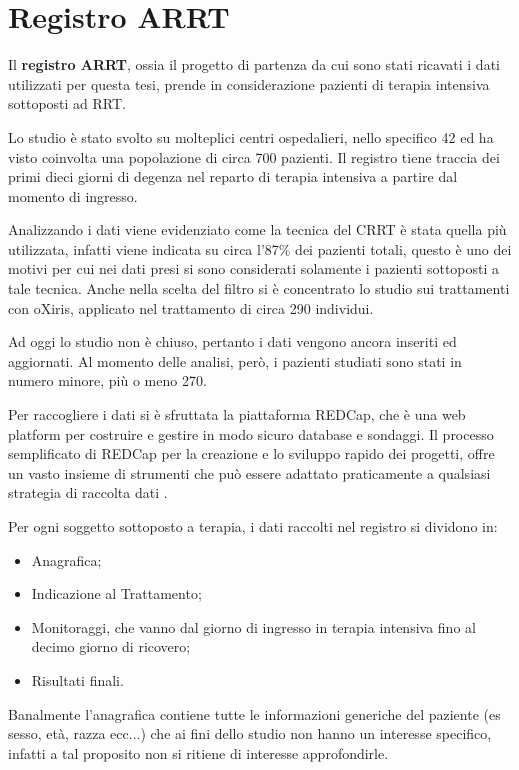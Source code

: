 \chapter{Registro ARRT}


Il \textbf{registro ARRT}, ossia il progetto di partenza da cui sono stati ricavati i dati utilizzati per questa tesi, prende in considerazione pazienti di terapia intensiva sottoposti ad RRT.

Lo studio è stato svolto su molteplici centri ospedalieri, nello specifico 42 ed ha visto coinvolta una popolazione di circa 700 pazienti. Il registro tiene traccia dei primi dieci giorni di degenza nel reparto di terapia intensiva a partire dal momento di ingresso.

Analizzando i dati viene evidenziato come la tecnica del CRRT è stata quella più utilizzata, infatti viene  indicata su circa  l'87\% dei pazienti totali, questo è uno dei motivi per cui nei dati presi si sono considerati solamente i pazienti sottoposti a tale tecnica.
Anche nella scelta del filtro si è concentrato lo studio sui trattamenti con oXiris, applicato nel trattamento di circa 290 individui.

Ad oggi lo studio non è chiuso, pertanto i dati vengono ancora inseriti ed aggiornati. Al momento delle analisi, però, i pazienti studiati sono stati in numero minore, più o meno 270.

Per raccogliere i dati si è sfruttata la piattaforma REDCap, che è una web platform per costruire e gestire in modo sicuro database e sondaggi. Il processo semplificato di REDCap per la creazione e lo sviluppo rapido dei progetti, offre un vasto insieme di strumenti che può essere adattato praticamente a qualsiasi strategia di raccolta dati \cite{REDCap}. 


Per ogni soggetto sottoposto a terapia, i dati raccolti nel registro si dividono in: 
\begin{itemize}
	 \parsep
	\item Anagrafica;
	\item Indicazione al Trattamento;
	\item Monitoraggi, che vanno dal giorno di ingresso in terapia intensiva fino al  decimo giorno di ricovero;
	\item Risultati finali.
\end{itemize}

Banalmente l'anagrafica contiene tutte le informazioni generiche del paziente (es sesso, età, razza ecc...) che ai fini dello studio non hanno un interesse specifico, infatti a tal proposito non si ritiene di interesse approfondirle.

